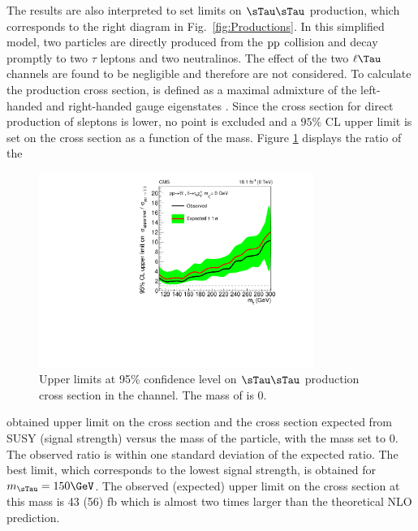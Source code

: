The results are also interpreted to set limits on $\sTau\sTau$ production, 
which corresponds to the right diagram in Fig.~\ref{fig:Productions}. 
In this simplified model, two \sTau particles are directly produced from the $\rm{pp}$ collision and decay promptly to two $\tau$ leptons and two neutralinos. 
The effect of the two $\ell\Tau$ channels are found to be negligible and therefore are not considered.
To calculate the production cross section, \sTau is 
defined as a maximal admixture of the left-handed and right-handed \sTau gauge eigenstates \cite{Fuks:2013lya}. 
Since the cross section for direct production of sleptons is lower, no point is excluded and a $95\%$ CL upper limit is set on 
the cross section  as a function of the \sTau mass. 
Figure \ref{fig:limit_stau_stau} displays the ratio of the 
\begin{linenomath}
\begin{figure}[!htb]
\centering
\includegraphics[width=0.8\textwidth,keepaspectratio=true]{StatisticsFig/ExclusionSTauSTauLsp1.pdf}
\caption{Upper limits at 95\% confidence level on $\sTau\sTau$ production cross section in the \tauTau channel. The mass of \PSGczDo is 0\GeV.}
\label{fig:limit_stau_stau}
\end{figure}
\end{linenomath}
obtained upper limit on the cross section and the cross section expected from SUSY (signal strength) versus the mass of the \sTau particle, with the \PSGczDo mass set to 0\GeV.
The observed ratio is within one standard deviation of  the expected ratio.
The best limit, which corresponds to the lowest signal strength, is obtained for $m_{\sTau}=150\GeV$. The observed (expected) upper limit on the cross section at this mass is 43 (56) fb which is almost two  times larger than the theoretical NLO prediction.



